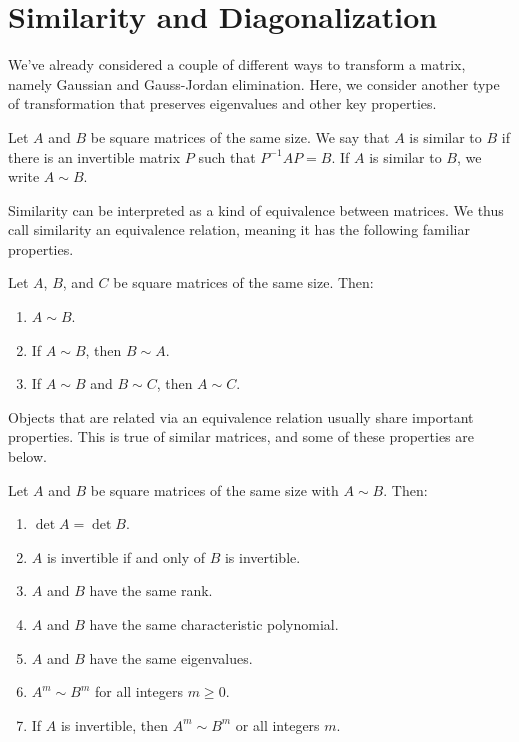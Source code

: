 \documentclass[../m073main.tex]{subfiles}
\begin{document}
\section{Similarity and Diagonalization}
We've already considered a couple of different ways to transform a matrix, namely Gaussian and Gauss-Jordan elimination.
Here, we consider another type of transformation that preserves eigenvalues and other key properties.

\begin{definition}
	Let $A$ and $B$ be square matrices of the same size.
	We say that $A$ is similar to $B$ if there is an invertible matrix $P$ such that $P^{-1}AP = B$.
	If $A$ is similar to $B$, we write $A \sim B$.
\end{definition}

Similarity can be interpreted as a kind of equivalence between matrices.
We thus call similarity an equivalence relation, meaning it has the following familiar properties.

\begin{theorem}
	Let $A$, $B$, and $C$ be square matrices of the same size.
	Then:
	\begin{enumerate}[label=(\alph*)]
		\item $A \sim B$.
		\item If $A \sim B$, then $B \sim A$.
		\item If $A \sim B$ and $B \sim C$, then $A \sim C$.
	\end{enumerate}
\end{theorem}

Objects that are related via an equivalence relation usually share important properties.
This is true of similar matrices, and some of these properties are below.

\begin{theorem}
	Let $A$ and $B$ be square matrices of the same size with $A \sim B$.
	Then:
	\begin{enumerate}[label=(\alph*)]
		\item $\det A = \det B$.
		\item $A$ is invertible if and only of $B$ is invertible.
		\item $A$ and $B$ have the same rank.
		\item $A$ and $B$ have the same characteristic polynomial.
		\item $A$ and $B$ have the same eigenvalues.
		\item $A^m \sim B^m$ for all integers $m \geq 0$.
		\item If $A$ is invertible, then $A^m \sim B^m$ or all integers $m$.
	\end{enumerate}
\end{theorem}
\end{document}
